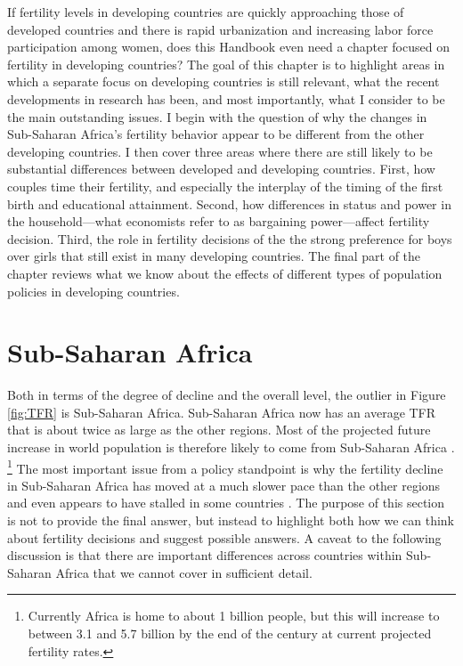 \documentclass[letterpaper,12pt]{article}
\begin{document}
If fertility levels in developing countries are quickly approaching 
those of developed countries and there is rapid urbanization and increasing labor
force participation among women, does this Handbook even need a chapter
focused on fertility in developing countries? 
The goal of this chapter is to highlight areas in which a separate focus 
on developing countries is still relevant, what the recent developments 
in research has been, and most importantly, what I consider to be the 
main outstanding issues.
I begin with the question of why the changes in Sub-Saharan Africa's 
fertility behavior appear to be different from the other developing countries. 
I then cover three areas where there are still likely to be substantial
differences between developed and developing countries.
First, how couples time their fertility, and especially the interplay of
the timing of the first birth and educational attainment.
Second, how differences in status and power in the household---what economists 
refer to as bargaining power---affect fertility decision.
Third, the role in fertility decisions of the the strong preference for boys 
over girls that still exist in many developing countries. 
The final part of the chapter reviews what we know about the effects
of different types of population policies in developing countries.


\section{Sub-Saharan Africa}

Both in terms of the degree of decline and the overall level, the
outlier in Figure \ref{fig:TFR} is Sub-Saharan Africa.
Sub-Saharan Africa now has an average TFR that is about twice as large
as the other regions.
Most of the projected future increase in world population is therefore
likely to come from Sub-Saharan Africa \citep{Gerland2014}.%
\footnote{
Currently Africa is home to about 1 billion people, but this will
increase to between 3.1 and 5.7 billion by the end of the century at
current projected fertility rates.}
The most important issue from a policy standpoint is why the fertility
decline in Sub-Saharan Africa has moved at a much slower pace than the
other regions and even appears to have stalled in some countries
\citep{Ainsworth1996a,Singh2017}.
The purpose of this section is not to provide the final answer, but
instead to highlight both how we can think about fertility decisions and
suggest possible answers.
A caveat to the following discussion is that there are important
differences across countries within Sub-Saharan Africa that we
cannot cover in sufficient detail.
\end{document}
